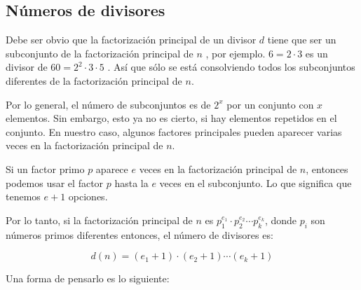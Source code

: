 \subsection{Números de divisores}

Debe ser obvio que la factorización principal de un divisor $d$ tiene que ser un subconjunto de la factorización principal de $n$ , por ejemplo. $6 = 2 \cdot 3$ es un divisor de $60 = 2^2  \cdot 3  \cdot 5$ . Así que sólo se está consolviendo todos los subconjuntos diferentes de la factorización principal de $n$.

Por lo general, el número de subconjuntos es de $2^x$ por un conjunto con $x$ elementos. Sin embargo, esto ya no es cierto, si hay elementos repetidos en el conjunto. En nuestro caso, algunos factores principales pueden aparecer varias veces en la factorización principal de $n$.

Si un factor primo $p$ aparece $e$ veces en la factorización principal de $n$, entonces podemos usar el factor $p$ hasta la $e$ veces en el subconjunto. Lo que significa que tenemos $e+1$ opciones.

Por lo tanto, si la factorización principal de $n$ es $p_1^{e_1} \cdot p_2^{e_2} \cdots p_k^{e_k}$, donde $p_i$ son números primos diferentes entonces, el número de divisores es:  

$$d(n) = (e_1 + 1) \cdot (e_2 + 1) \cdots (e_k + 1)$$

Una forma de pensarlo es lo siguiente:

